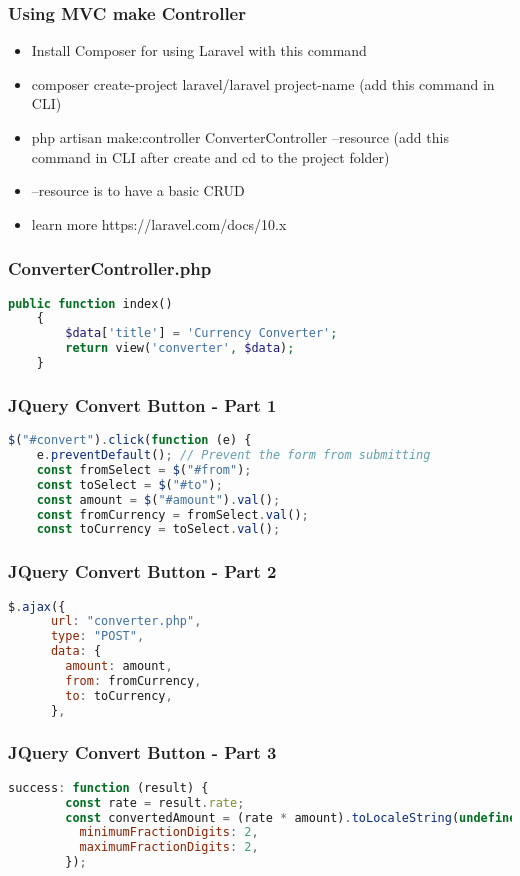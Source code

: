 \documentclass[aspectratio=169, table]{beamer}
\begin{document}
\begin{frame}[fragile]
    \frametitle{Using MVC make Controller}
    \begin{itemize}
        \item Install Composer for using Laravel with this command
        \item composer create-project laravel/laravel project-name (add this command in CLI)
        \item php artisan make:controller ConverterController --resource (add this command in CLI after create and cd to the project folder)
        \item --resource is to have a basic CRUD
        \item learn more https://laravel.com/docs/10.x
    \end{itemize}
\end{frame}

\begin{frame}[fragile]
    \frametitle{ConverterController.php}
    \begin{lstlisting}[language=PHP]
public function index()
    {
        $data['title'] = 'Currency Converter';
        return view('converter', $data);
    }
    \end{lstlisting}
\end{frame}

\begin{frame}[fragile]
    \frametitle{JQuery Convert Button - Part 1}
    \begin{lstlisting}[language=JavaScript]
$("#convert").click(function (e) {
    e.preventDefault(); // Prevent the form from submitting
    const fromSelect = $("#from");
    const toSelect = $("#to");
    const amount = $("#amount").val();
    const fromCurrency = fromSelect.val();
    const toCurrency = toSelect.val();
    \end{lstlisting}
\end{frame}

\begin{frame}[fragile]
    \frametitle{JQuery Convert Button - Part 2}
    \begin{lstlisting}[language=JavaScript]
$.ajax({
      url: "converter.php",
      type: "POST",
      data: {
        amount: amount,
        from: fromCurrency,
        to: toCurrency,
      },
    \end{lstlisting}
\end{frame}

\begin{frame}[fragile]
    \frametitle{JQuery Convert Button - Part 3}
    \begin{lstlisting}[language=JavaScript]
success: function (result) {
        const rate = result.rate;
        const convertedAmount = (rate * amount).toLocaleString(undefined, {
          minimumFractionDigits: 2,
          maximumFractionDigits: 2,
        });
    \end{lstlisting}
\end{frame}
\end{document}
